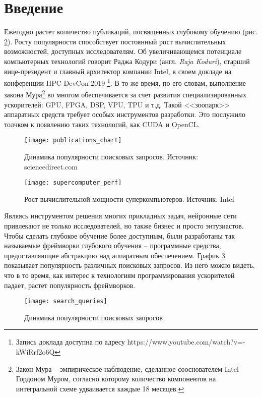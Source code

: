 \clearpage
\section{Введение}

Ежегодно растет количество публикаций, посвященных глубокому обучению (рис.
\ref{fig:publications}). Росту популярности способствует постоянный рост
вычислительных возможностей, доступных исследователям. Об увеличивающемся
потенциале компьютерных технологий говорит Раджа Кодури (англ. 
\textit{Raja Koduri}), старший вице-президент и главный архитектор компании
Intel, в своем докладе на конференции HPC DevCon 2019
\footnote{Запись доклада доступна по адресу https://www.youtube.com/watch?v=-kWiRrf2o6Q}.
В то же время, по его словам, выполнение закона Мура\footnote{Закон Мура -- 
эмпирическое наблюдение, сделанное сооснователем Intel Гордоном Муром, согласно
которому количество компонентов на интегральной схеме удваивается каждые 18
месяцев.} во многом обеспечивается за счет развития специализированных
ускорителей: GPU, FPGA, DSP, VPU, TPU и т.д. Такой <<зоопарк>> аппаратных
средств требует особых инструментов разработки. Это послужило толчком к появлению
таких технологий, как CUDA и OpenCL.
\begin{figure}[h]
\centering
\texttt{[image: publications\_chart]}
\caption{Динамика популярности поисковых запросов. Источник: sciencedirect.com}
\label{fig:publications}
\end{figure}
\begin{figure}[h]
\centering
\texttt{[image: supercomputer\_perf]}
\caption{Рост вычислительной мощности суперкомпьютеров. Источник: Intel}
\label{fig:publications}
\end{figure}

Являясь инструментом решения многих прикладных задач, нейронные сети привлекают
не только исследователей, но также бизнес и просто энтузиастов. Чтобы сделать
глубокое обучение более доступным, были разработаны так называемые фреймворки
глубокого обучения -- программные средства, предоставляющие абстракцию над
аппаратным обеспечением. График \ref{fig:search_queries} показывает популярность
различных поисковых запросов. Из него можно видеть, что в то время, как интерес
к технологиям программирования ускорителей падает, растет популярность
фреймворков.
\begin{figure}[h]
\centering
\texttt{[image: search\_queries]}
\caption{Динамика популярности поисковых запросов}
\label{fig:search_queries}
\end{figure}

